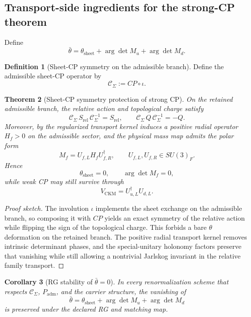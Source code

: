 \documentclass[11pt,a4paper]{article}
\newtheorem{theorem}{Theorem}[section]
\newtheorem{corollary}[theorem]{Corollary}
\theoremstyle{definition}
\newtheorem{definition}[theorem]{Definition}
\theoremstyle{remark}
\newcommand{\inv}{\iota}
\newcommand{\Padm}{P_{\mathrm{adm}}}
\begin{document}
\subsection{Transport-side ingredients for the strong-CP theorem}

Define
\begin{equation}
\label{eq:strong-cp}
\bar\theta=\theta_{\mathrm{sheet}}+\arg\det M_u+\arg\det M_d.
\end{equation}
\begin{definition}[Sheet-CP symmetry on the admissible branch]
\label{def:sheet-cp-symmetry}
Define the admissible sheet-CP operator by
\[
\mathcal C_\Sigma:=CP\circ\inv.
\]
\end{definition}

\begin{theorem}[Sheet-CP symmetry protection of strong CP]
\label{thm:sheet-cp-protection}
On the retained admissible branch, the relative action and topological charge satisfy
\[
\mathcal C_\Sigma\,S_{\mathrm{rel}}\,\mathcal C_\Sigma^{-1}=S_{\mathrm{rel}},
\qquad
\mathcal C_\Sigma\,Q\,\mathcal C_\Sigma^{-1}=-Q.
\]
Moreover, by  the regularized transport kernel induces a positive radial operator $H_f>0$ on the admissible sector, and the physical mass map admits the polar form
\[
M_f=U_{f,L}H_fU_{f,R}^\dagger,
\qquad
U_{f,L},U_{f,R}\in SU(3)_F.
\]
Hence
\[
\theta_{\mathrm{sheet}}=0,
\qquad
\arg\det M_f=0,
\]
while weak CP may still survive through
\[
V_{\mathrm{CKM}}=U_{u,L}^\dagger U_{d,L}.
\]
\end{theorem}

\begin{proof}[Proof sketch]
The involution $\inv$ implements the sheet exchange on the admissible branch, so composing it with $CP$ yields an exact symmetry of the relative action while flipping the sign of the topological charge. This forbids a bare $\theta$ deformation on the retained branch. The positive radial transport kernel removes intrinsic determinant phases, and the special-unitary holonomy factors preserve that vanishing while still allowing a nontrivial Jarlskog invariant in the relative family transport.
\end{proof}

\begin{corollary}[RG stability of $\bar\theta=0$]
\label{cor:strong-cp-rg-stability}
In every renormalization scheme that respects $\mathcal C_\Sigma$, $\Padm$, and the carrier structure, the vanishing of
\[
\bar\theta=\theta_{\mathrm{sheet}}+\arg\det M_u+\arg\det M_d
\]
is preserved under the declared RG and matching map.
\end{corollary}
\end{document}
